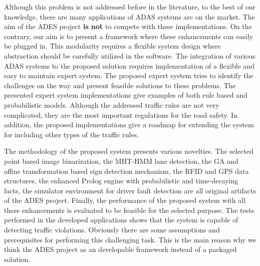 \documentclass[a4paper,oneside,12pt]{report}
\begin{document}
Although this problem is not addressed before in the literature, to the best of our knowledge, there are many applications of ADAS systems are on the market. The aim of the ADES project \textbf{is not} to compete with these implementations. On the contrary, our aim is to present a framework where these enhancements can easily be plugged in. This modularity requires a flexible system design where abstraction should be carefully utilized in the software.
The integration of various ADAS systems to the proposed solution requires implementation of a flexible and easy to maintain expert system. The proposed expert system tries to identify the challenges on the way and present feasible solutions to these problems. The presented expert system implementations give examples of both rule based and probabilistic models. Although the addressed traffic rules are not very complicated, they are the most important regulations for the road safety. In addition, the proposed implementations give a roadmap for extending the system for including other types of the traffic rules. 

The methodology of the proposed system presents various novelties. The selected point based image binarization, the MHT-HMM lane detection, the GA and affine transformation based sign detection mechanism, the RFID and GPS data structures, the enhanced Prolog engine with probabilistic and time-decaying facts, the simulator environment for driver fault detection are all original artifacts of the ADES project.
Finally, the performance of the proposed system with all these enhancements is evaluated to be feasible for the selected purpose. The tests performed in the developed applications shows that the system is capable of detecting traffic violations. Obviously there are some assumptions and prerequisites for performing this challenging task. This is the main reason why we think the ADES project as an developable framework instead of a packaged solution.
\end{document}
